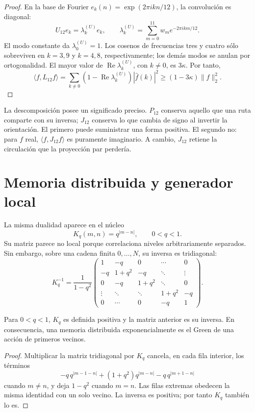 \begin{proof}
En la base de Fourier
\(e_k(n)=\exp(2\pi ikn/12)\), la convolución es diagonal:
\[
 U_{12}e_k=\lambda_k^{(U)}e_k,\qquad
 \lambda_k^{(U)}=\sum_{m=0}^{11}w_m e^{-2\pi ikm/12}.
\]
El modo constante da \(\lambda_0^{(U)}=1\).  Los cosenos de frecuencias tres y
cuatro sólo sobreviven en \(k=3,9\) y \(k=4,8\), respectivamente; los demás
modos se anulan por ortogonalidad.  El mayor valor de
\(\operatorname{Re}\lambda_k^{(U)}\), con \(k\neq0\), es \(3\kappa\).  Por tanto,
\[
 \langle f,L_{12}f\rangle
 =\sum_{k\neq0}(1-\operatorname{Re}\lambda_k^{(U)})|\widehat f(k)|^2
 \geq(1-3\kappa)\|f\|_2^2.
\]
\end{proof}

La descomposición posee un significado preciso.  \(P_{12}\) conserva aquello
que una ruta comparte con su inversa; \(J_{12}\) conserva lo que cambia de
signo al invertir la orientación.  El primero puede suministrar una forma
positiva.  El segundo no: para \(f\) real,
\(\langle f,J_{12}f\rangle\) es puramente imaginario.  A cambio,
\(J_{12}\) retiene la circulación que la proyección par perdería.

\section{Memoria distribuida y generador local}

La misma dualidad aparece en el núcleo
\[
 K_q(m,n)=q^{|m-n|},\qquad 0<q<1.
\]
Su matriz parece no local porque correlaciona niveles arbitrariamente
separados.  Sin embargo, sobre una cadena finita \(0,\ldots,N\), su inversa
es tridiagonal:
\[
 K_q^{-1}
 =\frac1{1-q^2}
 \begin{pmatrix}
 1&-q&0&\cdots&0\\
 -q&1+q^2&-q&\ddots&\vdots\\
 0&-q&1+q^2&\ddots&0\\
 \vdots&\ddots&\ddots&1+q^2&-q\\
 0&\cdots&0&-q&1
 \end{pmatrix}.
\]

\begin{proposition}
\label{prop:green-local-memoria-rev6}
Para \(0<q<1\), \(K_q\) es definida positiva y la matriz anterior es su
inversa.  En consecuencia, una memoria distribuida exponencialmente es el
Green de una acción de primeros vecinos.
\end{proposition}

\begin{proof}
Multiplicar la matriz tridiagonal por \(K_q\) cancela, en cada fila interior,
los términos
\[
 -q\,q^{|m-1-n|}
 +(1+q^2)q^{|m-n|}
 -q\,q^{|m+1-n|}
\]
cuando \(m\neq n\), y deja \(1-q^2\) cuando \(m=n\).  Las filas extremas
obedecen la misma identidad con un solo vecino.  La inversa es positiva;
por tanto \(K_q\) también lo es.
\end{proof}

